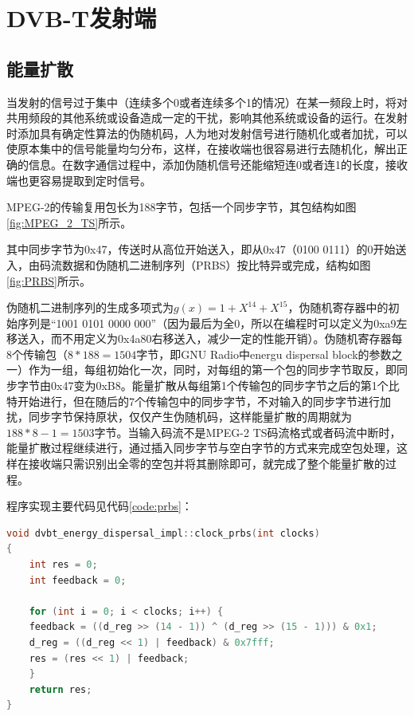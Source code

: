 \chapter{DVB-T发射端}
	\section{能量扩散}
		\par 当发射的信号过于集中（连续多个0或者连续多个1的情况）在某一频段上时，将对共用频段的其他系统或设备造成一定的干扰，影响其他系统或设备的运行。在发射时添加具有确定性算法的伪随机码，人为地对发射信号进行随机化或者加扰，可以使原本集中的信号能量均匀分布，这样，在接收端也很容易进行去随机化，解出正确的信息。在数字通信过程中，添加伪随机信号还能缩短连0或者连1的长度，接收端也更容易提取到定时信号。
		\par MPEG-2的传输复用包长为188字节，包括一个同步字节，其包结构如图\ref{fig:MPEG_2_TS}所示。
		
		\par 其中同步字节为0x47，传送时从高位开始送入，即从0x47（0100 0111）的0开始送入，由码流数据和伪随机二进制序列（PRBS）按比特异或完成，结构如图\ref{fig:PRBS}所示。
		
		\par 伪随机二进制序列的生成多项式为$g(x)=1+X^{14}+X^{15}$，伪随机寄存器中的初始序列是“1001 0101 0000 000”（因为最后为全0，所以在编程时可以定义为0xa9左移送入，而不用定义为0x4a80右移送入，减少一定的性能开销）。伪随机寄存器每8个传输包（$8*188=1504$字节，即GNU Radio中energu dispersal block的参数之一）作为一组，每组初始化一次，同时，对每组的第一个包的同步字节取反，即同步字节由0x47变为0xB8。能量扩散从每组第1个传输包的同步字节之后的第1个比特开始进行，但在随后的7个传输包中的同步字节，不对输入的同步字节进行加扰，同步字节保持原状，仅仅产生伪随机码，这样能量扩散的周期就为$188*8-1=1503$字节。当输入码流不是MPEG-2 TS码流格式或者码流中断时，能量扩散过程继续进行，通过插入同步字节与空白字节的方式来完成空包处理，这样在接收端只需识别出全零的空包并将其删除即可，就完成了整个能量扩散的过程。
		\par 程序实现主要代码见代码\ref{code:prbs}：
		\begin{lstlisting}[caption = {能量扩散}, label = {code:prbs}, language = C++ ]
void dvbt_energy_dispersal_impl::clock_prbs(int clocks)
{
	int res = 0;
	int feedback = 0;

	for (int i = 0; i < clocks; i++) {
	feedback = ((d_reg >> (14 - 1)) ^ (d_reg >> (15 - 1))) & 0x1;
	d_reg = ((d_reg << 1) | feedback) & 0x7fff;
	res = (res << 1) | feedback;
	}
	return res;
}
		\end{lstlisting}

